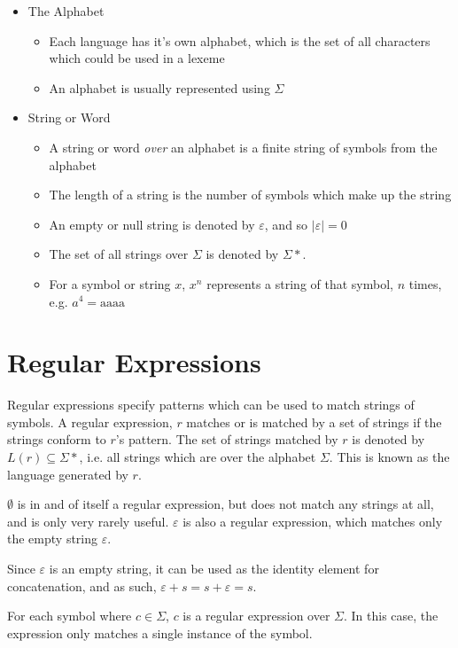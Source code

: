 \begin{itemize}
  \item The Alphabet
  \begin{itemize}
    \item Each language has it's own alphabet, which is the set of all characters which could be used in a lexeme
    \item An alphabet is usually represented using $\Sigma$
  \end{itemize}
  \item String or Word
  \begin{itemize}
    \item A string or word \textit{over} an alphabet is a finite string of symbols from the alphabet
    \item The length of a string is the number of symbols which make up the string
    \item An empty or null string is denoted by $\varepsilon$, and so $\mid \varepsilon \mid = 0$
    \item The set of all strings over $\Sigma$ is denoted by $\Sigma*$.
    \item For a symbol or string $x$, $x^n$ represents a string of that symbol, $n$ times, e.g. $a^4 = \mathrm{aaaa}$ 
  \end{itemize}
\end{itemize}

\section*{Regular Expressions}

Regular expressions specify patterns which can be used to match strings of symbols. A regular expression, $r$ matches
 or is matched by a set of strings if the strings conform to $r$'s pattern. The set of strings matched by $r$ is
 denoted by $L(r) \subseteq \Sigma*$, i.e. all strings which are over the alphabet $\Sigma$. This is known as the
 language generated by $r$.

$\emptyset$ is in and of itself a regular expression, but does not match any strings at all, and is only very rarely
 useful. $\varepsilon$ is also a regular expression, which matches only the empty string $\varepsilon$.

Since $\varepsilon$ is an empty string, it can be used as the identity element for concatenation, and as such,
 $\varepsilon + s = s + \varepsilon = s$.

For each symbol where $c \in \Sigma$, $c$ is a regular expression over $\Sigma$. In this case, the expression only
 matches a single instance of the symbol. 

